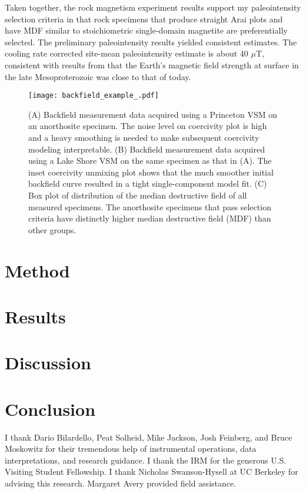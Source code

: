 \documentclass[draft]{agujournal2019}
\begin{document}
Taken together, the rock magnetism experiment results support my paleointensity selection criteria in that rock specimens that produce straight Arai plots and have MDF similar to stoichiometric single-domain magnetite are preferentially selected. The preliminary paleointensity results yielded consistent estimates. The cooling rate corrected site-mean paleointensity estimate is about 40 $\mu$T, consistent with results from \cite{Sprain2018a} that the Earth's magnetic field strength at surface in the late Mesoproterozoic was close to that of today. 

\begin{figure}
\begin{center}
	\noindent\texttt{[image: backfield\_example\_.pdf]}
\end{center}
\caption{\small{(A) Backfield measurement data acquired using a Princeton VSM on an anorthosite specimen. The noise level on coercivity plot is high and a heavy smoothing is needed to make subsequent coercivity modeling interpretable. (B) Backfield measurement data acquired using a Lake Shore VSM on the same specimen as that in (A). The inset coercivity unmixing plot shows that the much smoother initial backfield curve resulted in a tight single-component model fit. (C) Box plot of distribution of the median destructive field of all measured specimens. The anorthosite specimens that pass selection criteria have distinctly higher median destructive field (MDF) than other groups.}}
\label{fig:backfield}
\end{figure}










\section*{Method}

\section*{Results}

\section*{Discussion}

\section*{Conclusion}

\acknowledgments
I thank Dario Bilardello, Peat Solheid, Mike Jackson, Josh Feinberg, and Bruce Moskowitz for their tremendous help of instrumental operations, data interpretations, and research guidance. I thank the IRM for the generous U.S. Visiting Student Fellowship. I thank Nicholas Swanson-Hysell at UC Berkeley for advising this research. Margaret Avery provided field assistance.



\end{document}

